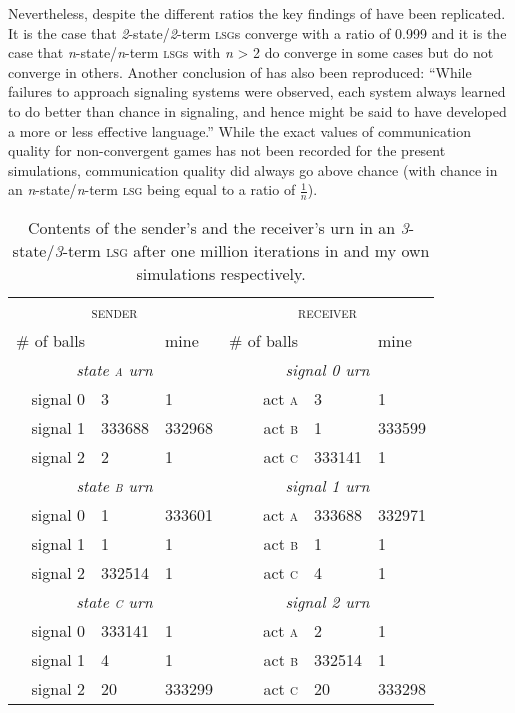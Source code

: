 \documentclass[
	DIV=calc,
	BCOR=0mm,
	pagesize,
]{scrartcl}
\newcommand{\lsg}{\textsc{lsg}}
\newcommand{\nslsg}[1]{\textit{#1}-state/\textit{#1}-term \lsg}
\begin{document}
Nevertheless, despite the different ratios the key findings of \citet{barrett_numerical_2006} have been replicated.
It is the case that \nslsg{2}s converge with a ratio of 0.999 and it is the case that \nslsg{n}s with \textit{n} > 2 do converge in some cases but do not converge in others.
Another conclusion of \citet[sec.~2, unpaginated preprint]{barrett_numerical_2006} has also been reproduced: ``While failures to approach signaling systems were observed, each system always learned to do better than chance in signaling, and hence might be said to have developed a more or less effective language.''
While the exact values of communication quality for non-convergent games has not been recorded for the present simulations, communication quality did always go above chance (with chance in an \nslsg{n} being equal to a ratio of \(\frac{1}{n}\)).

\begin{table}
	\centering
	\begin{tabular}{rllrll}
		\toprule
		\multicolumn{3}{c}{\textsc{sender}} & \multicolumn{3}{c}{\textsc{receiver}} \\
		\cmidrule(lr){1-3}\cmidrule(lr){4-6}
		\# of balls & \citeauthor{barrett_numerical_2006} & mine & \# of balls & \citeauthor{barrett_numerical_2006} & mine \\
		\midrule
		\multicolumn{3}{c}{\emph{state \textsc{a} urn}} & \multicolumn{3}{c}{\emph{signal 0 urn}} \\
		\cmidrule(lr){1-3}\cmidrule(lr){4-6}
		signal 0 & 3      & 1      & act \textsc{a} & 3      & 1 \\
		signal 1 & 333688 & 332968 & act \textsc{b} & 1      & 333599 \\
		signal 2 & 2      & 1      & act \textsc{c} & 333141 & 1 \\
		\midrule
		\multicolumn{3}{c}{\emph{state \textsc{b} urn}} & \multicolumn{3}{c}{\emph{signal 1 urn}} \\
		\cmidrule(lr){1-3}\cmidrule(lr){4-6}
		signal 0 & 1      & 333601 & act \textsc{a} & 333688 & 332971 \\
		signal 1 & 1      & 1      & act \textsc{b} & 1      & 1 \\
		signal 2 & 332514 & 1      & act \textsc{c} & 4      & 1 \\
		\midrule
		\multicolumn{3}{c}{\emph{state \textsc{c} urn}} & \multicolumn{3}{c}{\emph{signal 2 urn}} \\
		\cmidrule(lr){1-3}\cmidrule(lr){4-6}
		signal 0 & 333141 & 1      & act \textsc{a} & 2      & 1 \\
		signal 1 & 4      & 1      & act \textsc{b} & 332514 & 1 \\
		signal 2 & 20     & 333299 & act \textsc{c} & 20     & 333298 \\
		\bottomrule
	\end{tabular}
	\caption{Contents of the sender's and the receiver's urn in an \nslsg{3} after one million iterations in  and my own simulations respectively.}
	\label{tab:urns}
\end{table}
\end{document}
